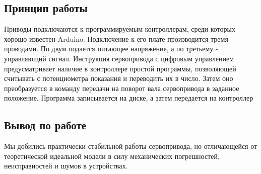 \documentclass[12pt,a4paper]{scrartcl}
\begin{document}
\subsection{Принцип работы}
Приводы подключаются к программируемым контроллерам, среди которых хорошо известен Arduino. Подключение к его плате производится тремя проводами. По двум подается питающее напряжение, а по третьему - управляющий сигнал. Инструкция сервопривода с цифровым управлением предусматривает наличие в контроллере простой программы, позволяющей считывать с потенциометра показания и переводить их в число. Затем оно преобразуется в команду передачи на поворот вала сервопривода в заданное положение. Программа записывается на диске, а затем передается на контроллер

\subsection{Вывод по работе}
Мы добились практически стабильной работы сервопривода, но отличающейся от теоретической идеальной модели в силу механических погрешностей, неисправностей и шумов в устройствах.
\end{document}
